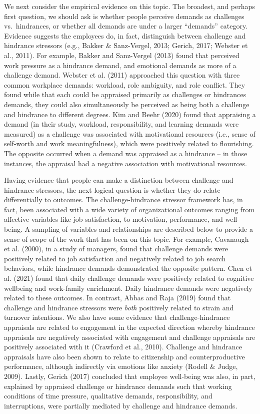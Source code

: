 \documentclass[
  english,
  man]{apa6}
\begin{document}
We next consider the empirical evidence on this topic. The broadest, and perhaps first question, we should ask is whether people perceive demands as challenges vs.~hindrances, or whether all demands are under a larger ``demands'' category. Evidence suggests the employees do, in fact, distinguish between challenge and hindrance stressors (e.g., Bakker \& Sanz-Vergel, 2013; Gerich, 2017; Webster et al., 2011). For example, Bakker and Sanz-Vergel (2013) found that perceived work pressure as a hindrance demand, and emotional demands as more of a challenge demand. Webster et al. (2011) approached this question with three common workplace demands: workload, role ambiguity, and role conflict. They found while that each could be appraised primarily as challenges or hindrances demands, they could also simultaneously be perceived as being both a challenge and hindrance to different degrees. Kim and Beehr (2020) found that appraising a demand (in their study, workload, responsibility, and learning demands were measured) as a challenge was associated with motivational resources (i.e., sense of self-worth and work meaningfulness), which were positively related to flourishing. The opposite occurred when a demand was appraised as a hindrance -- in those instances, the appraisal had a negative association with motivational resources.

Having evidence that people can make a distinction between challenge and hindrance stressors, the next logical question is whether they do relate differentially to outcomes. The challenge-hindrance stressor framework has, in fact, been associated with a wide variety of organizational outcomes ranging from affective variables like job satisfaction, to motivation, performance, and well-being. A sampling of variables and relationships are described below to provide a sense of scope of the work that has been on this topic. For example, Cavanaugh et al. (2000), in a study of managers, found that challenge demands were positively related to job satisfaction and negatively related to job search behaviors, while hindrance demands demonstrated the opposite pattern. Chen et al. (2021) found that daily challenge demands were positively related to cognitive wellbeing and work-family enrichment. Daily hindrance demands were negatively related to these outcomes. In contrast, Abbas and Raja (2019) found that challenge and hindrance stressors were \emph{both} positively related to strain and turnover intentions. We also have some evidence that challenge-hindrance appraisals are related to engagement in the expected direction whereby hindrance appraisals are negatively associated with engagement and challenge appraisals are positively associated with it (Crawford et al., 2010). Challenge and hindrance appraisals have also been shown to relate to citizenship and counterproductive performance, although indirectly via emotions like anxiety (Rodell \& Judge, 2009). Lastly, Gerich (2017) concluded that employee well-being was also, in part, explained by appraised challenge or hindrance demands such that working conditions of time pressure, qualitative demands, responsibility, and interruptions, were partially mediated by challenge and hindrance demands.
\end{document}
